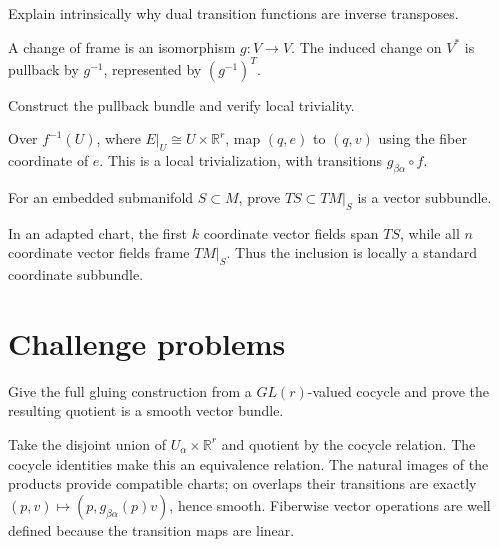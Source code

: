 \begin{problem}\label{prob:vii07-10}
Explain intrinsically why dual transition functions are inverse transposes.
\end{problem}
\begin{solution}
A change of frame is an isomorphism \(g:V\to V\). The induced change on \(V^*\) is pullback by \(g^{-1}\), represented by \((g^{-1})^T\).
\end{solution}

\begin{problem}[Pullback]\label{prob:vii07-11}
Construct the pullback bundle and verify local triviality.
\end{problem}
\begin{solution}
Over \(f^{-1}(U)\), where \(E|_U\cong U\times\mathbb R^r\), map \((q,e)\) to \((q,v)\) using the fiber coordinate of \(e\). This is a local trivialization, with transitions \(g_{\beta\alpha}\circ f\).
\end{solution}

\begin{problem}\label{prob:vii07-12}
For an embedded submanifold \(S\subset M\), prove \(TS\subset TM|_S\) is a vector subbundle.
\end{problem}
\begin{solution}
In an adapted chart, the first \(k\) coordinate vector fields span \(TS\), while all \(n\) coordinate vector fields frame \(TM|_S\). Thus the inclusion is locally a standard coordinate subbundle.
\end{solution}


\section{Challenge problems}

\begin{problem}\label{prob:vii07-ch01}
Give the full gluing construction from a \(GL(r)\)-valued cocycle and prove the resulting quotient is a smooth vector bundle.
\end{problem}
\begin{solution}
Take the disjoint union of \(U_\alpha\times\mathbb R^r\) and quotient by the cocycle relation. The cocycle identities make this an equivalence relation. The natural images of the products provide compatible charts; on overlaps their transitions are exactly \((p,v)\mapsto(p,g_{\beta\alpha}(p)v)\), hence smooth. Fiberwise vector operations are well defined because the transition maps are linear.
\end{solution}

